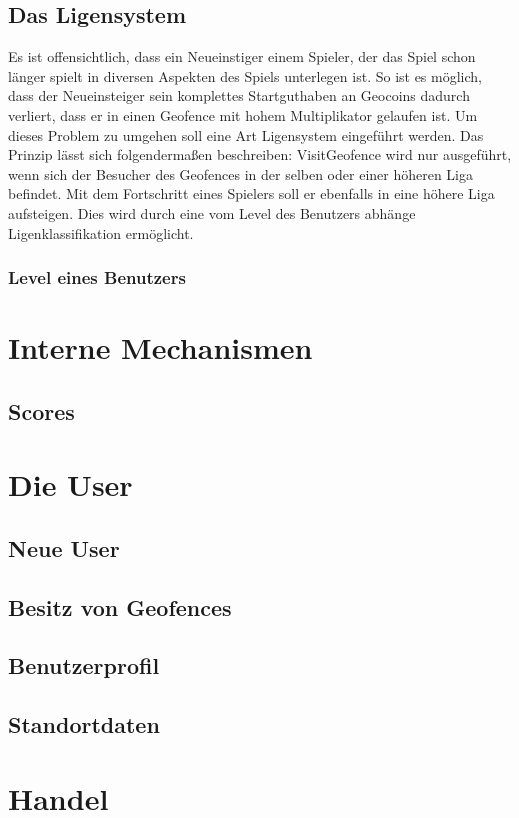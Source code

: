 \documentclass{scrreprt}
\begin{document}
\subsection{Das Ligensystem}
Es ist offensichtlich, dass ein Neueinstiger einem Spieler, der das Spiel schon länger spielt in diversen Aspekten des Spiels unterlegen ist. So ist es möglich, dass der Neueinsteiger sein komplettes Startguthaben an Geocoins dadurch verliert, dass er in einen Geofence mit hohem Multiplikator gelaufen ist. Um dieses Problem zu umgehen soll eine Art Ligensystem eingeführt werden. Das Prinzip lässt sich folgendermaßen beschreiben: VisitGeofence wird nur ausgeführt, wenn sich der Besucher des Geofences in der selben oder einer höheren Liga befindet. Mit dem Fortschritt eines Spielers soll er ebenfalls in eine höhere Liga aufsteigen. Dies wird durch eine vom Level des Benutzers abhänge Ligenklassifikation ermöglicht.
\subsubsection{Level eines Benutzers}

\section{Interne Mechanismen}
\subsection{Scores}


\section{Die User}
\subsection{Neue User}
\subsection{Besitz von Geofences}
\subsection{Benutzerprofil}
\subsection{Standortdaten}

\section{Handel}
\end{document}
